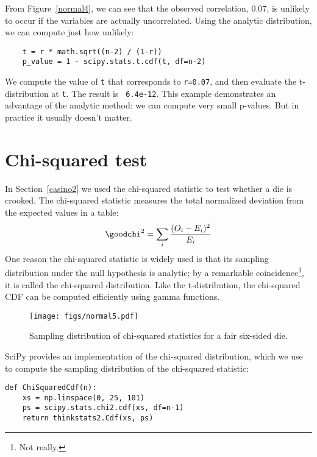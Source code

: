 From Figure~\ref{normal4}, we can see that the
observed correlation, 0.07, is unlikely to occur if the variables
are actually uncorrelated.
Using the analytic distribution, we can compute just how unlikely:

\begin{verbatim}
    t = r * math.sqrt((n-2) / (1-r))
    p_value = 1 - scipy.stats.t.cdf(t, df=n-2)
\end{verbatim}

We compute the value of {\tt t} that corresponds to {\tt r=0.07}, and
then evaluate the t-distribution at {\tt t}.  The result is {\tt
  6.4e-12}.  This example demonstrates an advantage of the analytic
method: we can compute very small p-values.  But in practice it
usually doesn't matter.


\section{Chi-squared test}

In Section~\ref{casino2} we used the chi-squared statistic to
test whether a die is crooked.  The chi-squared statistic measures
the total normalized deviation from the expected values in a table:
%
\[ \goodchi^2 = \sum_i \frac{(O_i - E_i)^2}{E_i} \]
%
One reason the chi-squared statistic is widely used is that
its sampling distribution under the null hypothesis is analytic;
by a remarkable coincidence\footnote{Not really.}, it is called
the chi-squared distribution.  Like the t-distribution, the
chi-squared CDF can be computed efficiently using gamma functions.

\begin{figure}
\centerline{\texttt{[image: figs/normal5.pdf]}}
\caption{Sampling distribution of chi-squared statistics for
a fair six-sided die.}
\label{normal5}
\end{figure}

SciPy provides an implementation of the chi-squared distribution,
which we use to compute the sampling distribution of the
chi-squared statistic:

\begin{verbatim}
def ChiSquaredCdf(n):
    xs = np.linspace(0, 25, 101)
    ps = scipy.stats.chi2.cdf(xs, df=n-1)
    return thinkstats2.Cdf(xs, ps)
\end{verbatim}

